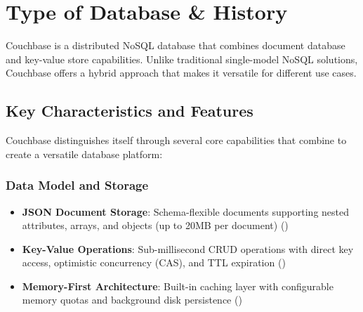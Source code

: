 \chapter{Type of Database \& History}

Couchbase is a distributed NoSQL database that combines document database and key-value store capabilities. Unlike traditional single-model NoSQL solutions, Couchbase offers a hybrid approach that makes it versatile for different use cases.





\section{Key Characteristics and Features}

Couchbase distinguishes itself through several core capabilities that combine to create a versatile database platform:

\subsection{Data Model and Storage}
\begin{itemize}
  \item \textbf{JSON Document Storage}: Schema-flexible documents supporting nested attributes, arrays, and objects (up to 20MB per document) (\cite{couchabse_data})
  \item \textbf{Key-Value Operations}: Sub-millisecond CRUD operations with direct key access, optimistic concurrency (CAS), and TTL expiration (\cite{couchbaseSubMS})
  \item \textbf{Memory-First Architecture}: Built-in caching layer with configurable memory quotas and background disk persistence (\cite[Buckets, Memory, and Storage]{CouchbaseArchitecture2025})
\end{itemize}

